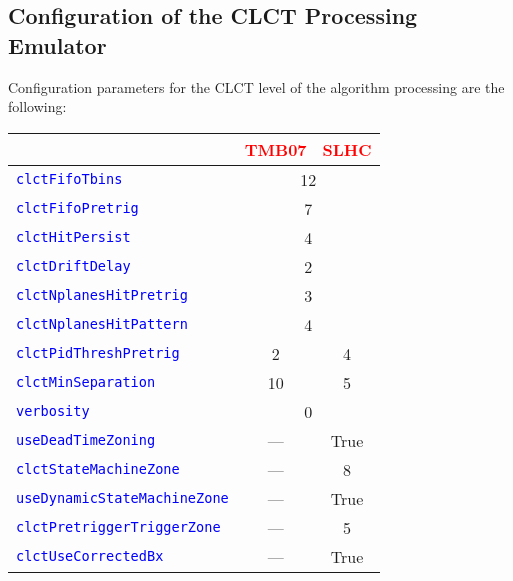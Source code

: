 \newpage

\subsection{Configuration of the CLCT Processing Emulator}
\label{sec:CLCT_conf}

Configuration parameters for the CLCT level of the algorithm processing are the following:

\begin{center}
\begin{tabular}{|l|c|c|}
\hline
  & \textcolor{red}{TMB07} & \textcolor{red}{SLHC} \\
\hline
\hline
\textcolor{blue}{\texttt{clctFifoTbins}} & \multicolumn{2}{c|}{12} \\
\hline
\textcolor{blue}{\texttt{clctFifoPretrig}} & \multicolumn{2}{c|}{7} \\
\hline
\textcolor{blue}{\texttt{clctHitPersist}} & \multicolumn{2}{c|}{4} \\
\hline
\textcolor{blue}{\texttt{clctDriftDelay}} & \multicolumn{2}{c|}{2} \\
\hline
\textcolor{blue}{\texttt{clctNplanesHitPretrig}} & \multicolumn{2}{c|}{3} \\
\hline
\textcolor{blue}{\texttt{clctNplanesHitPattern}} & \multicolumn{2}{c|}{4} \\
\hline
\textcolor{blue}{\texttt{clctPidThreshPretrig}} & 2 & 4 \\
\hline
\textcolor{blue}{\texttt{clctMinSeparation}}  & 10 & 5 \\
\hline
\textcolor{blue}{\texttt{verbosity}} & \multicolumn{2}{c|}{0} \\
\hline
\textcolor{blue}{\texttt{useDeadTimeZoning}} & --- & True \\
\hline
\textcolor{blue}{\texttt{clctStateMachineZone}} & --- & 8 \\
\hline
\textcolor{blue}{\texttt{useDynamicStateMachineZone}} & --- & True \\
\hline
\textcolor{blue}{\texttt{clctPretriggerTriggerZone}} & --- & 5 \\
\hline
\textcolor{blue}{\texttt{clctUseCorrectedBx}} & --- & True \\
\hline
\end{tabular}
\end{center}

